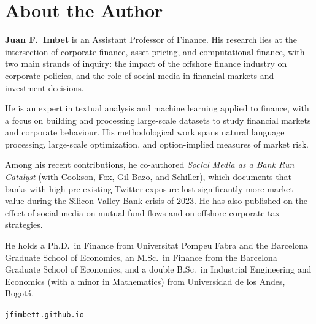 \chapter*{About the Author}

\noindent\textbf{Juan F.\ Imbet} is an Assistant Professor of Finance. His
research lies at the intersection of corporate finance, asset pricing, and
computational finance, with two main strands of inquiry: the impact of the
offshore finance industry on corporate policies, and the role of social media
in financial markets and investment decisions.

\medskip
\noindent He is an expert in textual analysis and machine learning applied to
finance, with a focus on building and processing large-scale datasets to study
financial markets and corporate behaviour. His methodological work spans
natural language processing, large-scale optimization, and option-implied
measures of market risk.

\medskip
\noindent Among his recent contributions, he co-authored
\textit{Social Media as a Bank Run Catalyst} (with Cookson, Fox, Gil-Bazo, and
Schiller), which documents that banks with high pre-existing Twitter exposure
lost significantly more market value during the Silicon Valley Bank crisis of
2023. He has also published on the effect of social media on mutual fund flows
and on offshore corporate tax strategies.

\medskip
\noindent He holds a Ph.D.\ in Finance from Universitat Pompeu Fabra and the
Barcelona Graduate School of Economics, an M.Sc.\ in Finance from the Barcelona
Graduate School of Economics, and a double B.Sc.\ in Industrial Engineering and
Economics (with a minor in Mathematics) from Universidad de los Andes,
Bogot\'{a}.

\bigskip
\noindent\href{https://jfimbett.github.io}{\texttt{jfimbett.github.io}}

